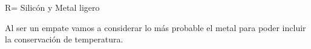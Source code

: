 R= Silicón y Metal ligero 

Al ser un empate vamos a considerar lo más probable el metal para poder incluir la conservación de temperatura.
